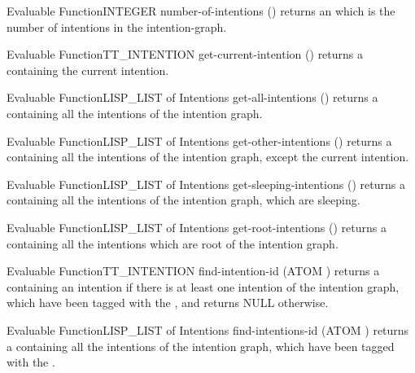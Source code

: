 \begin{typeefa}{Evaluable Function}{INTEGER} {number-of-intentions} {()}
returns an  which is the number of intentions in the
intention-graph.
\end{typeefa}

\begin{typeefa}{Evaluable Function}{TT\_INTENTION} {get-current-intention} {()}
returns a  containing the current intention.
\end{typeefa}

\begin{typeefa}{Evaluable Function}{LISP\_LIST of Intentions} {get-all-intentions} {()}
returns a  containing all the intentions of the intention graph.
\end{typeefa}

\begin{typeefa}{Evaluable Function}{LISP\_LIST of Intentions} {get-other-intentions} {()}
returns a  containing all the intentions of the intention graph,
except the current intention.
\end{typeefa}

\begin{typeefa}{Evaluable Function}{LISP\_LIST of Intentions} {get-sleeping-intentions} {()}
returns a  containing all the intentions of the intention graph,
which are sleeping.
\end{typeefa}

\begin{typeefa}{Evaluable Function}{LISP\_LIST of Intentions}  {get-root-intentions} {()}
returns a  containing all the intentions  which are root of the
intention graph.
\end{typeefa}

\begin{typeefa}{Evaluable Function}{TT\_INTENTION} {find-intention-id} {(ATOM
)} 
returns a  containing an intention if there is at least one
intention of the intention graph, which have been tagged with the 
, and returns NULL otherwise.
\end{typeefa}

\begin{typeefa}{Evaluable Function}{LISP\_LIST of Intentions} {find-intentions-id} {(ATOM )}
returns a  containing all the intentions of the intention graph,
which have been tagged with the  .
\end{typeefa}

